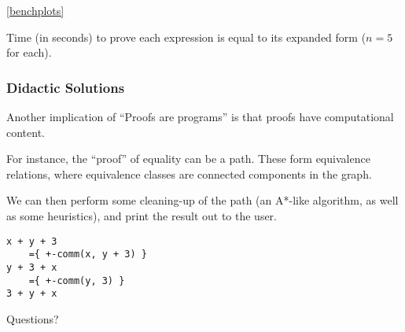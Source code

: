 \documentclass[usenames,dvipsnames]{beamer}
\begin{document}
\begin{frame}[fragile]
  \vfill
  \begin{minipage}{0.2\textwidth}
    \ref{benchplots}
  \end{minipage}%
  \begin{minipage}{0.8\textwidth}
    Time (in seconds) to prove each expression is equal to its expanded form ($n
    = 5$ for each).
  \end{minipage}
\end{frame}
\begin{frame}[fragile]
  \frametitle{Didactic Solutions}
  Another implication of ``Proofs are programs'' is that proofs have
  computational content.

  For instance, the ``proof'' of equality can be a path. These form equivalence
  relations, where equivalence classes are connected components in the graph.

  We can then perform some cleaning-up of the path (an A*-like algorithm, as
  well as some heuristics), and print the result out to the user.

  \centering
\begin{BVerbatim}
x + y + 3
    ={ +-comm(x, y + 3) }
y + 3 + x
    ={ +-comm(y, 3) }
3 + y + x
\end{BVerbatim}

\end{frame}

\begin{frame}[standout]
  Questions?
\end{frame}
\end{document}
